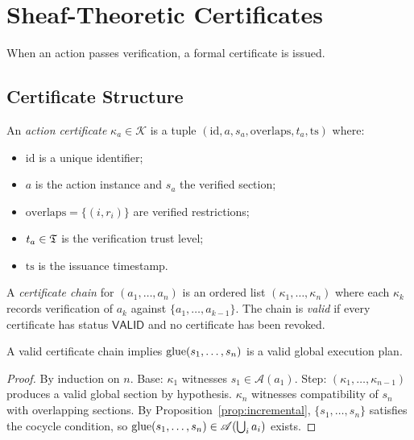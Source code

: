 \documentclass[11pt]{article}
\newcommand{\ActionSheaf}{\mathscr{A}}
\newcommand{\CertBundle}{\mathcal{K}}
\newcommand{\CertValid}{\mathsf{VALID}}
\begin{document}
\section{Sheaf-Theoretic Certificates}\label{sec:certificates}

When an action passes verification, a formal certificate is issued.

\subsection{Certificate Structure}\label{subsec:cert-structure}

\begin{definition}\label{def:certificate}
An \emph{action certificate} $\kappa_a \in \CertBundle$ is a tuple
$(\mathrm{id}, a, s_a, \mathrm{overlaps}, t_a, \mathrm{ts})$ where:
\begin{itemize}
  \item $\mathrm{id}$ is a unique identifier;
  \item $a$ is the action instance and $s_a$ the verified section;
  \item $\mathrm{overlaps} = \{(i, r_i)\}$ are verified restrictions;
  \item $t_a \in \mathfrak{T}$ is the verification trust level;
  \item $\mathrm{ts}$ is the issuance timestamp.
\end{itemize}
\end{definition}

\begin{definition}\label{def:cert-chain}
A \emph{certificate chain} for $(a_1, \ldots, a_n)$ is an ordered
list $(\kappa_1, \ldots, \kappa_n)$ where each $\kappa_k$ records
verification of $a_k$ against $\{a_1, \ldots, a_{k-1}\}$.  The
chain is \emph{valid} if every certificate has status $\CertValid$
and no certificate has been revoked.
\end{definition}

\begin{theorem}\label{thm:cert-chain}
A valid certificate chain implies $\mathrm{glue}(s_1, \ldots, s_n)$ is a
valid global execution plan.
\end{theorem}

\begin{proof}
By induction on $n$.  Base: $\kappa_1$ witnesses $s_1 \in \ActionSheaf(a_1)$.
Step: $(\kappa_1, \ldots, \kappa_{n-1})$ produces a valid global section
by hypothesis.  $\kappa_n$ witnesses compatibility of $s_n$ with
overlapping sections.  By Proposition~\ref{prop:incremental},
$\{s_1, \ldots, s_n\}$ satisfies the cocycle condition, so
$\glue(s_1, \ldots, s_n) \in \ActionSheaf(\bigcup_i a_i)$ exists.
\end{proof}
\end{document}
